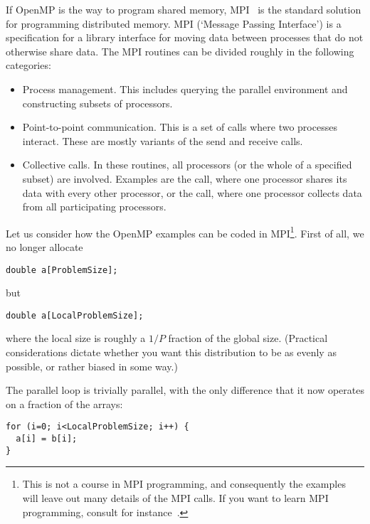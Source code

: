 If OpenMP is the way to program shared memory,
\acf{MPI}~\cite{mpi-reference} is the standard solution for
programming distributed memory. MPI (`Message Passing Interface') is a
specification for a library interface for moving data
between processes that do
not otherwise share data. The MPI routines can be divided roughly in
the following categories:
\begin{itemize}
\item Process management. This includes querying the parallel
  environment and constructing subsets of processors.
\item Point-to-point communication. This is a set of calls where two processes
  interact. These are mostly variants of the send and receive calls.
\item{} Collective calls. In these
  routines, all processors (or the whole of a specified subset) are
  involved. Examples are the  call, where one
  processor shares its data with every other processor, or the
   call, where one processor collects data from all
  participating processors.
\end{itemize}

Let us consider how the OpenMP examples can be coded in
MPI\footnote{This is not a course in MPI programming, and consequently
  the examples will leave out many details of the MPI calls. If you
  want to learn MPI programming, consult for
  instance~\cite{MPI1}.}. First of all, we no longer allocate
\begin{verbatim}
double a[ProblemSize];
\end{verbatim}
but
\begin{verbatim}
double a[LocalProblemSize];
\end{verbatim}
where the local size is roughly a $1/P$ fraction of the global
size. (Practical considerations dictate whether you want this
distribution to be as evenly as possible, or rather biased in some
way.)

The parallel loop
is trivially parallel, with the only difference that it now operates
on a fraction of the arrays:
\begin{verbatim}
for (i=0; i<LocalProblemSize; i++) {
  a[i] = b[i];
}
\end{verbatim}

